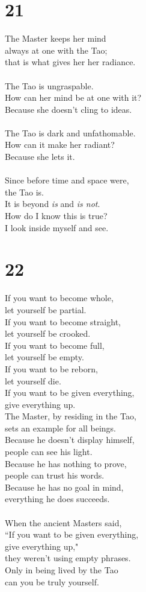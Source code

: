 \documentclass[b5paper, 12pt, oneside]{book}
\begin{document}
\chapter*{21}
The Master keeps her mind\\
always at one with the Tao;\\
that is what gives her her radiance.\\
\\
The Tao is ungraspable.\\
How can her mind be at one with it?\\
Because she doesn't cling to ideas.\\
\\
The Tao is dark and unfathomable.\\
How can it make her radiant?\\
Because she lets it.\\
\\
Since before time and space were,\\
the Tao is.\\
It is beyond \emph{is} and \emph{is not}.\\
How do I know this is true?\\
I look inside myself and see.\\

\chapter*{22}
If you want to become whole,\\
let yourself be partial.\\
If you want to become straight,\\
let yourself be crooked.\\
If you want to become full,\\
let yourself be empty.\\
If you want to be reborn,\\
let yourself die.\\
If you want to be given everything,\\
give everything up.
\\
The Master, by residing in the Tao,\\
sets an example for all beings.\\
Because he doesn't display himself,\\
people can see his light.\\
Because he has nothing to prove,\\
people can trust his words.\\
Because he has no goal in mind,\\
everything he does succeeds.\\
\\
When the ancient Masters said,\\
``If you want to be given everything,\\
give everything up,"\\
they weren't using empty phrases.\\
Only in being lived by the Tao\\
can you be truly yourself.\\
\end{document}
